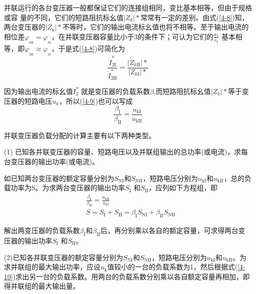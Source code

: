 \documentclass{book}
\begin{document}
并联运行的各台变压器一般都保证它们的连接组相同，变比基本相等，但由于规格或容 量的不同，它们的短路阻抗标幺值$\left| Z_{k}^{{}} \right|*$常常有一定的差别。由式(\ref{4-8})知，两台变压器的$\left| Z_{k}^{{}} \right|*$不等时，它们的输出电流标幺值也将不相等。至于输出电流的相位差${{\varphi }_{_{k\text{II}}}}={{\varphi }_{_{k\text{I}}}}$，在并联变压器容量比小于3的条件下；可认为它们的$\frac{{{x}_{k}}}{{{r}_{k}}}$ 基本相等，即${{\varphi }_{_{k\text{II}}}}\approx {{\varphi }_{_{k\text{I}}}}$，于是式(\ref{4-8})可简化为
\begin{equation}
\frac{\dot{I}_{2\text{I}}^{*}}{\dot{I}_{2\text{II}}^{*}}=\frac{\left| {{Z}_{k\text{II}}} \right|*}{\left| {{Z}_{k\text{I}}} \right|*}
\label{4-9}
\end{equation}

因为输出电流的标幺值$I_{2}^{*}$ 就是变压器的负载系数$\beta $,而短路阻抗标幺值$\left| {{Z}_{k}} \right|*$等于变压器的短路电压${{u}_{k}}$，所以(\ref{4-9})也可以写成
\begin{equation}
\frac{{{\beta }_{\text{I}}}}{{{\beta }_{\text{II}}}}=\frac{{{u}_{\text{kI}}}}{{{u}_{\text{kII}}}}
\label{4-10}
\end{equation}

并联变压器负载分配的计算主要有以下两种类型。

(1)	已知各并联变压器的容量、短路电压以及并联组输出的总功率(或电流)，求每台变压器的输出功率(或电流)。

如已知两台变压器的额定容量分别为${{S}_{\text{NI}}}$和${{S}_{\text{NII}}}$，短路电压分别为${{u}_{\text{kI}}}$和${{u}_{\text{kII}}}$，总的负载功率为S。为求两台变压器的输出功率${{S}_{\text{I}}}$ 和${{S}_{\text{II}}}$，应列如下方程组，即
\begin{align}
& \frac{{{\beta }_{\text{I}}}}{{{\beta }_{\text{II}}}}=\frac{{{u}_{\text{kII}}}}{{{u}_{\text{kI}}}} \\ 
& S={{S}_{\text{I}}}+{{S}_{\text{II}}}={{\beta }_{\text{I}}}{{S}_{\text{NI}}}+{{\beta }_{\text{II}}}{{S}_{\text{NII}}}
\label{4-11}
\end{align}

解出两变压器的负载系数${{\beta }_{\text{I}}}$和${{\beta }_{\text{II}}}$后，再分别乘以各自的额定容量，可求得两台变压器的输出功率${{S}_{\text{I}}}$ 和${{S}_{\text{II}}}$。

(2)已知各并联变压器的额定容量分别为${{S}_{\text{NI}}}$和${{S}_{\text{NII}}}$，短路电压分别为${{u}_{\text{kI}}}$和${{u}_{\text{kII}}}$。为求并联组的最大输出功率，应设${{u}_{\text{k}}}$值较小的一台的负载系数为1，然后根据式(\ref{4-10})求出另一台的负载系数。用两台的负载系数分别乘以各自额定容量再相加，即得并联组的最大输出量。
\end{document}
